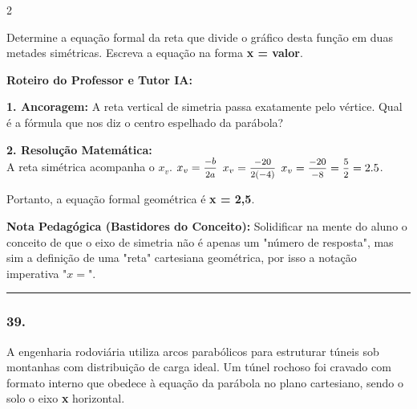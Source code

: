 \begin{multicols*}{2}
\begin{enunciadoLiteral}
Determine a equação formal da reta que divide o gráfico desta função em duas metades simétricas. Escreva a equação na forma \textbf{x = valor}.
\end{enunciadoLiteral}

\ifgabarito
    \begin{tcolorbox}[colback=CorTitUm!5, colframe=CorTitUm, boxrule=1pt, arc=4pt, left=6pt, right=6pt, top=6pt, bottom=6pt]
    \small\textbf{\textcolor{CorTitUm}{Roteiro do Professor e Tutor IA:}}\par\vspace{0.1cm}
    \color{CinzaEscuro}
    \textbf{1. Ancoragem:} A reta vertical de simetria passa exatamente pelo vértice. Qual é a fórmula que nos diz o centro espelhado da parábola?\par\vspace{0.1cm}
    \textbf{2. Resolução Matemática:}\\
    A reta simétrica acompanha o $x_v$.
    $x_v = \mfrac{-b}{2a}$
    $x_v = \mfrac{-20}{2(-4)}$
    $x_v = \mfrac{-20}{-8} = \mfrac{5}{2} = 2.5$.
    
    Portanto, a equação formal geométrica é \textbf{x = 2,5}.
    \end{tcolorbox}
    \vspace{0.15cm}
    
    \begin{boxexplicacao}
    \textbf{Nota Pedagógica (Bastidores do Conceito):} Solidificar na mente do aluno o conceito de que o eixo de simetria não é apenas um "número de resposta", mas sim a definição de uma "reta" cartesiana geométrica, por isso a notação imperativa "$x =$".
    \end{boxexplicacao}
\fi

\par\vspace{\espacoQuestao}

\noindent\textcolor{CorLinha}{\rule{\linewidth}{0.5pt}} 
\par\vspace{\espacoPreQuestao}
\subsubsection*{39.} 
\begin{enunciadoLiteral}
A engenharia rodoviária utiliza arcos parabólicos para estruturar túneis sob montanhas com distribuição de carga ideal. Um túnel rochoso foi cravado com formato interno que obedece à equação da parábola no plano cartesiano, sendo o solo o eixo \textbf{x} horizontal.


\end{enunciadoLiteral}
\end{multicols*}
